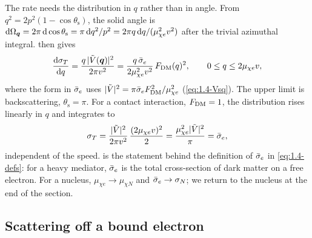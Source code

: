 The rate needs the distribution in $q$ rather than in angle. From $q^2 = 2p^2(1 - \cos\theta_{\mathrm{s}})$, the solid angle is $\mathrm{d}\Omega_{\bm{q}} = 2\pi\,\mathrm{d}\cos\theta_{\mathrm{s}} = \pi\,\mathrm{d} q^2/p^2 = 2\pi q\,\mathrm{d} q/(\mu_{\chi e}^2v^2)$ after the trivial azimuthal integral.  then gives
\begin{equation}
  \frac{\mathrm{d}\sigma_T}{\mathrm{d} q} = \frac{q\,|\tilde V(\bm{q})|^2}{2\pi v^2}
  = \frac{q\,\bar{\sigma}_{e}}{2\mu_{\chi e}^2v^2}\,F_{\mathrm{DM}}(q)^2 , \qquad 0 \le q \le 2\mu_{\chi e}v ,
  \label{eq:2.2-dsdq}
\end{equation}
where the form in $\bar{\sigma}_{e}$ uses $|\tilde V|^2 = \pi\bar{\sigma}_{e}F_{\mathrm{DM}}^2/\mu_{\chi e}^2$ (\cref{eq:1.4-Vsq}). The upper limit is backscattering, $\theta_{\mathrm{s}} = \pi$. For a contact interaction, $F_{\mathrm{DM}} = 1$, the distribution rises linearly in $q$ and integrates to
\begin{equation}
  \sigma_T = \frac{|\tilde V|^2}{2\pi v^2}\,\frac{(2\mu_{\chi e}v)^2}{2} = \frac{\mu_{\chi e}^2|\tilde V|^2}{\pi} = \bar{\sigma}_{e} ,
  \label{eq:2.2-sigma-free}
\end{equation}
independent of the speed.  is the statement behind the definition of $\bar{\sigma}_{e}$ in \cref{eq:1.4-defs}: for a heavy mediator, $\bar{\sigma}_{e}$ is the total cross-section of dark matter on a free electron. For a nucleus, $\mu_{\chi e} \to \mu_{\chi N}$ and $\bar{\sigma}_{e} \to \sigma_N$; we return to the nucleus at the end of the section.

\subsection{Scattering off a bound electron}

